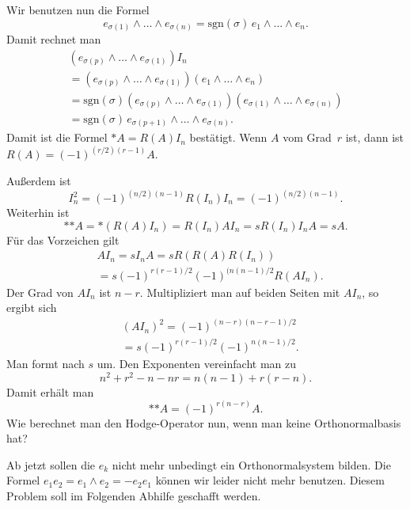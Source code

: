 \documentclass[a4paper,10pt,fleqn,twocolumn,twoside]{article}
\numberwithin{equation}{section}
\begin{document}
Wir benutzen nun die Formel
\begin{equation}
e_{\sigma(1)}\wedge\ldots\wedge e_{\sigma(n)}
= \mathrm{sgn}(\sigma)\, e_1\wedge\ldots\wedge e_n.
\end{equation}
Damit rechnet man
\begin{gather*}
(e_{\sigma(p)}\wedge\ldots\wedge e_{\sigma(1)})I_n\\
= (e_{\sigma(p)}\wedge\ldots\wedge e_{\sigma(1)})
(e_1\wedge\ldots\wedge e_n)\\
= \mathrm{sgn}(\sigma)(e_{\sigma(p)}\wedge\ldots\wedge e_{\sigma(1)})
(e_{\sigma(1)}\wedge\ldots\wedge e_{\sigma(n)})\\
= \mathrm{sgn}(\sigma)\, e_{\sigma(p+1)}\wedge\ldots\wedge e_{\sigma(n)}.
\end{gather*}
Damit ist die Formel $*A=R(A)I_n$ bestätigt.
Wenn $A$ vom Grad~$r$ ist, dann ist
$R(A) = (-1)^{(r/2)(r-1)}A$.

Außerdem ist
\[I_n^2 = (-1)^{(n/2)(n-1)} R(I_n)I_n = (-1)^{(n/2)(n-1)}.\]
Weiterhin ist
\[*{*A} = *(R(A)I_n) = R(I_n)AI_n = sR(I_n)I_nA = sA.\]
Für das Vorzeichen gilt
\begin{equation}
\begin{split}
& AI_n = sI_nA = sR(R(A)R(I_n))\\
&= s(-1)^{r(r-1)/2}(-1)^{(n(n-1)/2} R(AI_n).
\end{split}
\end{equation}
Der Grad von $AI_n$ ist $n-r$.
Multipliziert man auf beiden Seiten mit $AI_n$, so ergibt sich
\begin{equation}
\begin{split}
& (AI_n)^2 = (-1)^{(n-r)(n-r-1)/2}\\
&= s(-1)^{r(r-1)/2}(-1)^{n(n-1)/2}.
\end{split}
\end{equation}
Man formt nach $s$ um. Den Exponenten vereinfacht man zu
\begin{equation}
n^2+r^2-n-nr = n(n-1) + r(r-n).
\end{equation}
Damit erhält man
\begin{equation}
*{*A} = (-1)^{r(n-r)}A.
\end{equation}
Wie berechnet man den Hodge-Operator nun, wenn man keine
Orthonormalbasis hat?

Ab jetzt sollen die $e_k$ nicht mehr unbedingt ein Orthonormalsystem
bilden. Die Formel $e_1e_2=e_1\wedge e_2=-e_2e_1$ können wir leider
nicht mehr benutzen. Diesem Problem soll im Folgenden Abhilfe
geschafft werden.
\end{document}
